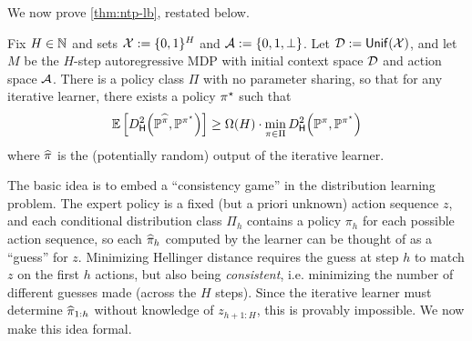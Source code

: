 We now prove \cref{thm:ntp-lb}, restated below.

\begin{theorem}\label{thm:ntp-lb-app}
Fix $H \in \mathbb{N}$ and sets $\mathcal{X} := \{0,1\}^H$ and $\mathcal{A} := \{0,1,\perp\}$. Let $\mathcal{D} := \mathsf{Unif}(\mathcal{X})$, and let $M$ be the $H$-step autoregressive MDP with initial context space $\mathcal{D}$ and action space $\mathcal{A}$. There is a policy class $\Pi$ with no parameter sharing, so that for any iterative learner, there exists a policy $\pi^{\star}$ such that
\[\EE\left[\Dhels{\BP^{\pihat}}{\BP^{\pistar}}\right] \geq \Omega(H) \cdot \min_{\pi \in \Pi} \Dhels{\BP^{\pi}}{\BP^{\pistar}}\]
where $\widehat{\pi}$ is the (potentially random) output of the iterative learner.
\end{theorem}


The basic idea is to embed a ``consistency game'' in the distribution learning problem. The expert policy is a fixed (but a priori unknown) action sequence $z$, and each conditional distribution class $\Pi_h$ contains a policy $\pi_h$ for each possible action sequence, so each $\widehat{\pi}_h$ computed by the learner can be thought of as a ``guess'' for $z$. Minimizing Hellinger distance requires the guess at step $h$ to match $z$ on the first $h$ actions, but also being \emph{consistent}, i.e. minimizing the number of different guesses made (across the $H$ steps). Since the iterative learner must determine $\widehat{\pi}_{1:h}$ without knowledge of $z_{h+1:H}$, this is provably impossible. We now make this idea formal.

